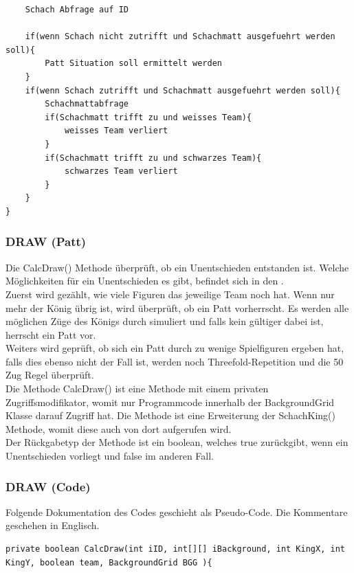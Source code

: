 \documentclass[12pt,a4paper]{article}
\begin{document}
{\begin{lstlisting}
	Schach Abfrage auf ID
	
	if(wenn Schach nicht zutrifft und Schachmatt ausgefuehrt werden soll){
		Patt Situation soll ermittelt werden
	}
	if(wenn Schach zutrifft und Schachmatt ausgefuehrt werden soll){
		Schachmattabfrage
		if(Schachmatt trifft zu und weisses Team){
			weisses Team verliert
		}	
		if(Schachmatt trifft zu und schwarzes Team){
			schwarzes Team verliert
		}
	}
}
\end{lstlisting}

\subsubsection{DRAW (Patt)}
\label{SUBSUBSEC:draw}

Die CalcDraw() Methode überprüft, ob ein Unentschieden entstanden ist. Welche Möglichkeiten für ein Unentschieden es gibt, befindet sich in den . \\
Zuerst wird gezählt, wie viele Figuren das jeweilige Team noch hat. Wenn nur mehr der König übrig ist, wird überprüft, ob ein Patt vorherrscht. Es werden alle möglichen Züge des Königs durch simuliert und falls kein gültiger dabei ist, herrscht ein Patt vor. \\
Weiters wird geprüft, ob sich ein Patt durch zu wenige Spielfiguren ergeben hat, falls dies ebenso nicht der Fall ist, werden noch Threefold-Repetition und die 50 Zug Regel überprüft. \\[2ex]
Die Methode CalcDraw() ist eine Methode mit einem privaten Zugriffsmodifikator, womit nur Programmcode innerhalb der BackgroundGrid Klasse darauf Zugriff hat. Die Methode ist eine Erweiterung der SchachKing() Methode, womit diese auch von dort aufgerufen wird. \\
Der Rückgabetyp der Methode ist ein boolean, welches true zurückgibt, wenn ein Unentschieden vorliegt und false im anderen Fall.

 \subsubsection{DRAW (Code)}
 \label{SUBSUBSEC:DRAW-CODE}

Folgende Dokumentation des Codes geschieht als Pseudo-Code. Die Kommentare geschehen in Englisch.

\textbf{\lstset{language=Java}}
\begin{lstlisting}
private boolean CalcDraw(int iID, int[][] iBackground, int KingX, int KingY, boolean team, BackgroundGrid BGG ){
	

\end{lstlisting}}
\end{document}

